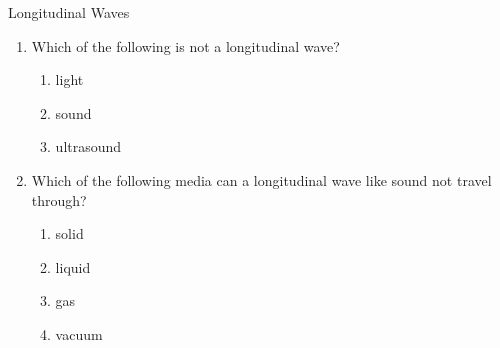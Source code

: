 \begin{eocexercises}{Longitudinal Waves}
            \nopagebreak
      \label{m38783*id293753}\begin{enumerate}[noitemsep, label=\textbf{\arabic*}. ] 
            \label{m38783*uid27}\item Which of the following is not a longitudinal wave?
\label{m38783*id293768}\begin{enumerate}[noitemsep, label=\textbf{\alph*}. ] 
\label{m38783*uid29}\item light
\label{m38783*uid30}\item sound
\label{m38783*uid31}\item ultrasound
\end{enumerate}
                \label{m38783*uid32}\item Which of the following media can a longitudinal wave like sound not travel through?
\label{m38783*id293834}\begin{enumerate}[noitemsep, label=\textbf{\alph*}. ] 
            \label{m38783*uid33}\item solid
\label{m38783*uid34}\item liquid
\label{m38783*uid35}\item gas
\label{m38783*uid36}\item vacuum
\end{enumerate}
                

\end{enumerate}
\end{eocexercises}
